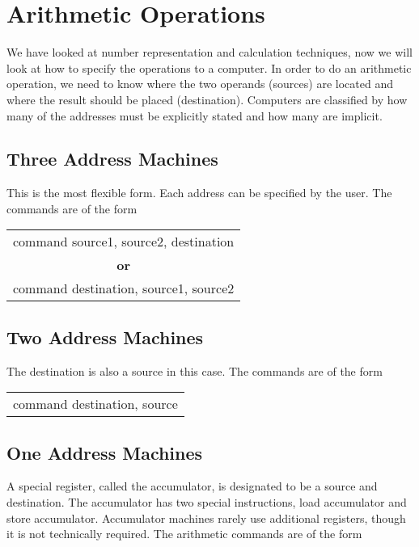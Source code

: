 \chapter{Arithmetic Operations}
\label{c-arith}


We have looked at number representation and calculation techniques, now we will look at how to specify the operations to a computer.  In order to do an arithmetic operation, we need to know where the two operands (sources) are located and where the result should be placed (destination).  Computers are classified by how many of the addresses must be explicitly stated and how many are implicit.

\section{Three Address Machines}

This is the most flexible form.  Each address can be specified by the user.  The commands are of the form

\begin{tabular}{c}
command source1, source2, destination \\
\textbf{or} \\
command destination, source1, source2 \\
\end{tabular}

\ThreeAddy

\section{Two Address Machines}

The destination is also a source in this case.  The commands are of the form

\begin{tabular}{c}
command destination, source \\
\end{tabular}

\section{One Address Machines}

A special register, called the accumulator, is designated to be a source and destination.  The accumulator has two special instructions, load accumulator and store accumulator.  Accumulator machines rarely use additional registers, though it is not technically required.  The arithmetic commands are of the form


